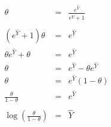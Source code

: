 \begin{eqnarray*}
	\theta &=& \frac{e^{\hat{Y}}}{e^{\hat{Y}}+1} \\
	&&\\
	(e^{\hat{Y}}+1)\theta & = & e^{\hat{Y}} \\
	\theta e^{\hat{Y}} + \theta &=& e^{\hat{Y}} \\
	\theta & = & e^{\hat{Y}} - \theta e^{\hat{Y}} \\
	\theta & = & e^{\hat{Y}}(1-\theta) \\
	\frac{\theta}{1-\theta} &=& e^{\hat{Y}}\\
	&&\\
	\log\left(\frac{\theta}{1-\theta}\right) &=& \hat{Y}
\end{eqnarray*}
